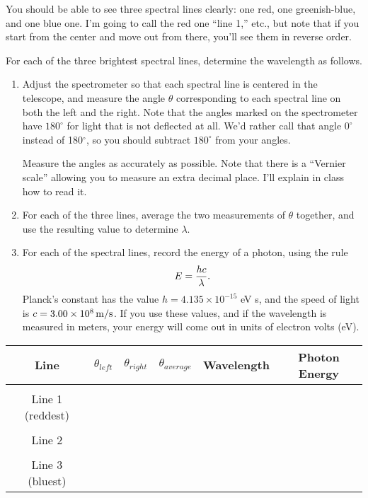 You should be able to see three spectral lines clearly: one red,
one greenish-blue, and one blue one. I'm going to call the red one
``line 1,'' etc., but note that if you start from the center and
move out from there, you'll see them in reverse order.

For each of the three brightest spectral lines, determine
the wavelength as follows.  

\begin{enumerate}
\item Adjust the spectrometer so that each spectral
line is centered in the telescope, and measure the angle $\theta$
corresponding to each spectral line on both the left and the right.
Note that the angles marked on the spectrometer have $180^\circ$
for light that is not deflected at all.  We'd rather
call that angle $0^\circ$ instead of 180$^\circ$, so you should
subtract $180^\circ$ from your angles.

Measure the angles as accurately as possible.  Note that there is 
a ``Vernier scale'' allowing you to measure an extra decimal place.
I'll explain in class how to read it.

\item For each of the three lines, average the two measurements of
$\theta$ together, and use the resulting value to determine $\lambda$.

\item For each of the spectral lines, record the energy of a photon,
using the rule 
$$
E={hc\over\lambda}.
$$
Planck's constant has the value $h=4.135\times 10^{-15}$ eV s, and
the speed of light is $c=3.00\times 10^8\,{\rm m/s}$.  If you use these
values, and if the wavelength is measured in meters, your energy
will come out in units of electron volts (eV).
\end{enumerate}


\begin{center}
\begin{tabular}{|c|c|c|c|c|c|}\hline
Line        & $\theta_{left}$     & $\theta_{right}$     & $\theta_{average}$ & Wavelength  & Photon Energy \\ 
\hline
& & & & & \\
Line 1 (reddest)  &                             &                              &                    &                    &   \\ \hline
& & & & & \\
Line 2   &                             &                              &                    &                    &   \\ \hline
& & & & & \\
Line 3 (bluest)  &                             &                              &                    &                    &   \\ \hline
\end{tabular}
\end{center}

